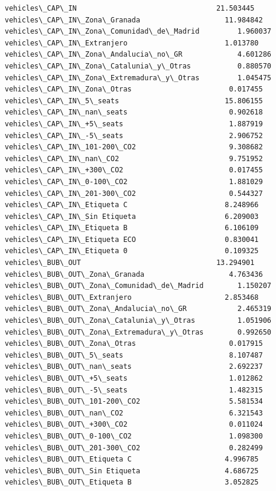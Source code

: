 \documentclass[11pt]{article}
\begin{document}
\begin{Verbatim}[commandchars=\\\{\}]
vehicles\_CAP\_IN                                 21.503445
vehicles\_CAP\_IN\_Zona\_Granada                    11.984842
vehicles\_CAP\_IN\_Zona\_Comunidad\_de\_Madrid         1.960037
vehicles\_CAP\_IN\_Extranjero                       1.013780
vehicles\_CAP\_IN\_Zona\_Andalucia\_no\_GR             4.601286
vehicles\_CAP\_IN\_Zona\_Catalunia\_y\_Otras           0.880570
vehicles\_CAP\_IN\_Zona\_Extremadura\_y\_Otras         1.045475
vehicles\_CAP\_IN\_Zona\_Otras                       0.017455
vehicles\_CAP\_IN\_5\_seats                         15.806155
vehicles\_CAP\_IN\_nan\_seats                        0.902618
vehicles\_CAP\_IN\_+5\_seats                         1.887919
vehicles\_CAP\_IN\_-5\_seats                         2.906752
vehicles\_CAP\_IN\_101-200\_CO2                      9.308682
vehicles\_CAP\_IN\_nan\_CO2                          9.751952
vehicles\_CAP\_IN\_+300\_CO2                         0.017455
vehicles\_CAP\_IN\_0-100\_CO2                        1.881029
vehicles\_CAP\_IN\_201-300\_CO2                      0.544327
vehicles\_CAP\_IN\_Etiqueta C                       8.248966
vehicles\_CAP\_IN\_Sin Etiqueta                     6.209003
vehicles\_CAP\_IN\_Etiqueta B                       6.106109
vehicles\_CAP\_IN\_Etiqueta ECO                     0.830041
vehicles\_CAP\_IN\_Etiqueta 0                       0.109325
vehicles\_BUB\_OUT                                13.294901
vehicles\_BUB\_OUT\_Zona\_Granada                    4.763436
vehicles\_BUB\_OUT\_Zona\_Comunidad\_de\_Madrid        1.150207
vehicles\_BUB\_OUT\_Extranjero                      2.853468
vehicles\_BUB\_OUT\_Zona\_Andalucia\_no\_GR            2.465319
vehicles\_BUB\_OUT\_Zona\_Catalunia\_y\_Otras          1.051906
vehicles\_BUB\_OUT\_Zona\_Extremadura\_y\_Otras        0.992650
vehicles\_BUB\_OUT\_Zona\_Otras                      0.017915
vehicles\_BUB\_OUT\_5\_seats                         8.107487
vehicles\_BUB\_OUT\_nan\_seats                       2.692237
vehicles\_BUB\_OUT\_+5\_seats                        1.012862
vehicles\_BUB\_OUT\_-5\_seats                        1.482315
vehicles\_BUB\_OUT\_101-200\_CO2                     5.581534
vehicles\_BUB\_OUT\_nan\_CO2                         6.321543
vehicles\_BUB\_OUT\_+300\_CO2                        0.011024
vehicles\_BUB\_OUT\_0-100\_CO2                       1.098300
vehicles\_BUB\_OUT\_201-300\_CO2                     0.282499
vehicles\_BUB\_OUT\_Etiqueta C                      4.996785
vehicles\_BUB\_OUT\_Sin Etiqueta                    4.686725
vehicles\_BUB\_OUT\_Etiqueta B                      3.052825

\end{Verbatim}
\end{document}
